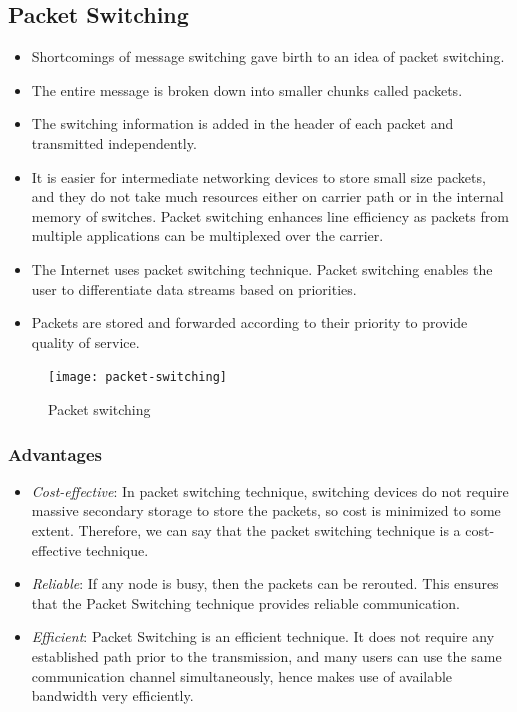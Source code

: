 \begin{multicols}{2}
	\subsection{Packet Switching}
	\begin{itemize}
		\item Shortcomings of message switching gave birth to an idea of packet switching.
		\item The entire message is broken down into smaller chunks called packets.
		\item The switching information is added in the header of each packet and transmitted independently.
		\item It is easier for intermediate networking devices to store small size packets, and they do not take much resources either on carrier path or in the internal memory of switches.
		Packet switching enhances line efficiency
		as packets from multiple applications can
		be multiplexed over the carrier.
		\item The Internet uses packet switching technique. Packet switching enables the user to differentiate data streams based on priorities.
		\item Packets are stored and forwarded according to their priority to provide quality of service.
	\end{itemize}
\end{multicols}



\begin{figure}[hpb!]
	\begin{center}
		\texttt{[image: packet-switching]}
		\caption{Packet switching}
		\label{fig:packet-switching}
	\end{center}
\end{figure}
\raggedbottom

\begin{multicols}{2}
	\subsubsection*{Advantages}
	\begin{itemize}
		\item \textit{Cost-effective}: In packet switching technique, switching devices do not require massive secondary storage to store the packets, so cost is minimized to some extent. Therefore, we can say that the packet switching technique is a cost-effective technique.
		\item \textit{Reliable}: If any node is busy, then the packets can be rerouted. This ensures that the Packet Switching technique provides reliable communication.
		\item \textit{Efficient}: Packet Switching is an efficient technique. It does not require any established path prior to the transmission, and many users can use the same communication channel simultaneously, hence makes use of available bandwidth very efficiently.
	\end{itemize}
\end{multicols}


